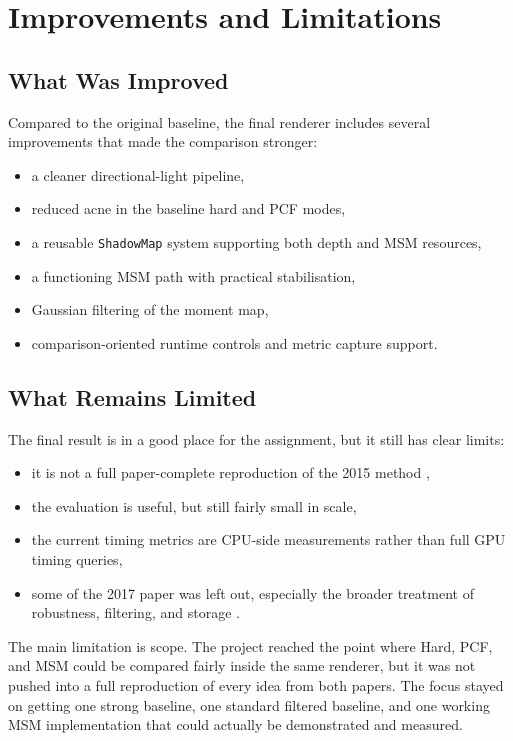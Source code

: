 \section{Improvements and Limitations}

\subsection{What Was Improved}

Compared to the original baseline, the final renderer includes several improvements that made the comparison stronger:
\begin{itemize}
    \item a cleaner directional-light pipeline,
    \item reduced acne in the baseline hard and PCF modes,
    \item a reusable \texttt{ShadowMap} system supporting both depth and MSM resources,
    \item a functioning MSM path with practical stabilisation,
    \item Gaussian filtering of the moment map,
    \item comparison-oriented runtime controls and metric capture support.
\end{itemize}

\subsection{What Remains Limited}

The final result is in a good place for the assignment, but it still has clear limits:
\begin{itemize}
    \item it is not a full paper-complete reproduction of the 2015 method \cite{peters2015msm},
    \item the evaluation is useful, but still fairly small in scale,
    \item the current timing metrics are CPU-side measurements rather than full GPU timing queries,
    \item some of the 2017 paper was left out, especially the broader treatment of robustness, filtering, and storage \cite{peters2017improved}.
\end{itemize}

The main limitation is scope. The project reached the point where Hard, PCF, and MSM could be compared fairly inside the same renderer, but it was not pushed into a full reproduction of every idea from both papers. The focus stayed on getting one strong baseline, one standard filtered baseline, and one working MSM implementation that could actually be demonstrated and measured.

